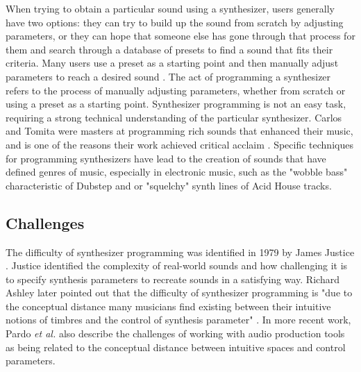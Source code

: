 When trying to obtain a particular sound using a synthesizer, users generally have two options: they can try to build up the sound from scratch by adjusting parameters, or they can hope that someone else has gone through that process for them and search through a database of presets to find a sound that fits their criteria. Many users use a preset as a starting point and then manually adjust parameters to reach a desired sound \cite{krekovic2019insights}. The act of programming a synthesizer refers to the process of manually adjusting parameters, whether from scratch or using a preset as a starting point. Synthesizer programming is not an easy task, requiring a strong technical understanding of the particular synthesizer. Carlos and Tomita were masters at programming rich sounds that enhanced their music, and is one of the reasons their work achieved critical acclaim \cite{jenkins2019analog}. Specific techniques for programming synthesizers have lead to the creation of sounds that have defined genres of music, especially in electronic music, such as the "wobble bass" characteristic of Dubstep and or "squelchy" synth lines of Acid House tracks. 



\subsection{Challenges}
The difficulty of synthesizer programming was identified in 1979 by James Justice \cite{justice1979analytic}. Justice identified the complexity of real-world sounds and how challenging it is to specify synthesis parameters to recreate sounds in a satisfying way. Richard Ashley later pointed out that the difficulty of synthesizer programming is "due to the conceptual distance many musicians find existing between their intuitive notions of timbres and the control of synthesis parameter" \cite{ashley1986knowledge}. In more recent work, Pardo \textit{et al.} also describe the challenges of working with audio production tools as being related to the conceptual distance between intuitive spaces and control parameters. 

